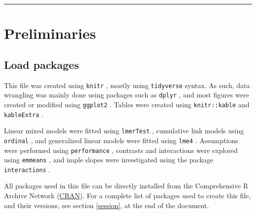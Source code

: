 \documentclass[
  bookmarksnumbered]{article}
\begin{document}
\begin{center}\rule{0.5\linewidth}{0.5pt}\end{center}

\section{Preliminaries}\label{preliminaries}

\subsection{Load packages}\label{load-packages}

This file was created using \texttt{knitr} \autocite{knitrcit}, mostly using \texttt{tidyverse} \autocite{tidyversecit} syntax. As such, data wrangling was mainly done using packages such as \texttt{dplyr} \autocite{dplyrcit}, and most figures were created or modified using \texttt{ggplot2} \autocite{ggplotcit}. Tables were created using \texttt{knitr::kable} and \texttt{kableExtra} \autocite{kableExtracit}.

Linear mixed models were fitted using \texttt{lmerTest} \autocite{lmertestcit}, cumulative link models using \texttt{ordinal} \autocite{ordinalcit}, and generalized linear models were fitted using \texttt{lme4} \autocite{lme4cit}. Assumptions were performed using \texttt{performance} \autocite{ludecke2021}, contrasts and interactions were explored using \texttt{emmeans} \autocite{emmeanscit}, and imple slopes were investigated using the package \texttt{interactions} \autocite{interactionscit}.

All packages used in this file can be directly installed from the Comprehensive R Archive Network (\href{https://cran.r-project.org/}{CRAN}). For a complete list of packages used to create this file, and their versions, see section \ref{session}, at the end of the document.
\end{document}
